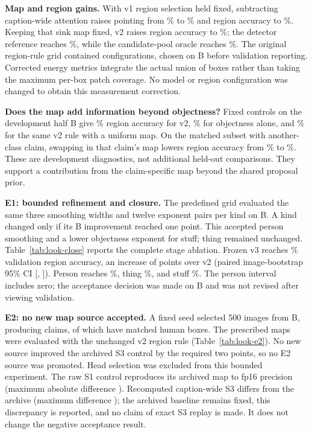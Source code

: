 \textbf{Map and region gains.} With v1 region selection held fixed, subtracting caption-wide attention raises pointing from \LookRawPoint\% to \LookSinkPoint\% and region accuracy to \LookVOneRegion\%. Keeping that sink map fixed, v2 raises region accuracy to \LookVTwoRegion\%; the detector reference reaches \LookDetectorRegion\%, while the candidate-pool oracle reaches \LookOracleRegion\%. The original region-rule grid contained \LookGridCount{} configurations, chosen on B before validation reporting. Corrected energy metrics integrate the actual union of boxes rather than taking the maximum per-box patch coverage. No model or region configuration was changed to obtain this measurement correction.




\textbf{Does the map add information beyond objectness?} Fixed controls on the development half B give \LookBRegion\% region accuracy for v2, \LookBObjectness\% for objectness alone, and \LookBUniform\% for the same v2 rule with a uniform map. On the matched subset with another-class claim, swapping in that claim's map lowers region accuracy from \LookSwapOwn\% to \LookSwapOther\%. These are development diagnostics, not additional held-out comparisons. They support a contribution from the claim-specific map beyond the shared proposal prior.

\textbf{E1: bounded refinement and closure.} The predefined grid evaluated the same three smoothing widths and twelve exponent pairs per kind on B. A kind changed only if its B improvement reached one point. This accepted person smoothing and a lower objectness exponent for stuff; thing remained unchanged. Table~\ref{tab:look-close} reports the complete stage ablation. Frozen v3 reaches \LookClosedRegion\% validation region accuracy, an increase of \LookClosedGain{} points over v2 (paired image-bootstrap 95\% CI [\LookClosedLow, \LookClosedHigh]). Person reaches \LookClosedPerson\%, thing \LookClosedThing\%, and stuff \LookClosedStuff\%. The person interval includes zero; the acceptance decision was made on B and was not revised after viewing validation.




\textbf{E2: no new map source accepted.} A fixed seed selected 500 images from B, producing \LookENClaims{} claims, of which \LookENBoxClaims{} have matched human boxes. The prescribed maps were evaluated with the unchanged v2 region rule (Table~\ref{tab:look-e2}). No new source improved the archived S3 control by the required two points, so no E2 source was promoted. Head selection was excluded from this bounded experiment. The raw S1 control reproduces its archived map to fp16 precision (maximum absolute difference \LookERawError). Recomputed caption-wide S3 differs from the archive (maximum difference \LookECaptionError); the archived baseline remains fixed, this discrepancy is reported, and no claim of exact S3 replay is made. It does not change the negative acceptance result.

